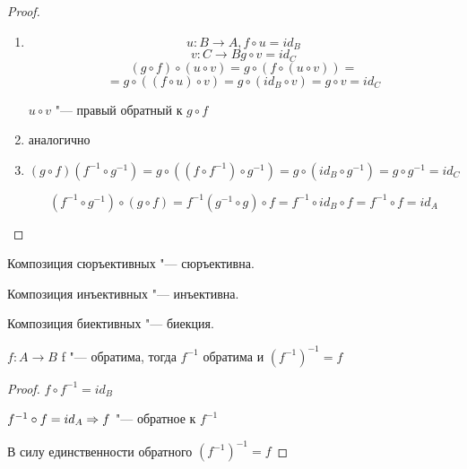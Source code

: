 \begin{proof}
\begin{enumerate}
\item
$$u: B \to A, f \circ u = id_B$$
$$v: C \to B g \circ v = id_C$$
$$(g \circ f) \circ (u \circ v) = g \circ (f \circ (u \circ v)) = $$
$$= g \circ ((f \circ u) \circ v) = g \circ (id_B \circ v) = g \circ v = id_C$$

$u \circ v$ "--- правый обратный к $g \circ f$

\item аналогично

\item 
$$(g \circ f)(f^{-1} \circ g^{-1}) = g \circ ((f \circ f^{-1}) \circ g^{-1}) = g \circ (id_B \circ g^{-1}) = g \circ g^{-1} = id_C$$

$$(f^{-1} \circ g^{-1})\circ(g \circ f) = f^{-1}(g^{-1} \circ g) \circ f = f^{-1} \circ id_B \circ f = f^{-1} \circ f = id_A$$

\end{enumerate}
\end{proof}

\begin{conseq}{}
Композиция сюръективных "--- сюръективна.

Композиция инъективных "--- инъективна.

Композиция биективных "--- биекция.

\end{conseq}

\begin{theorem}{}
$f: A \to B$ f "--- обратима, тогда $f^{-1}$ обратима и $(f^{-1})^{-1} = f$
\end{theorem}

\begin{proof}
$f \circ f^{-1} = id_{B}$

$f^{-1} \circ f = id_A \Rightarrow f$ "--- обратное к $f^{-1}$

В силу единственности обратного $(f^{-1})^{-1} = f$
\end{proof}